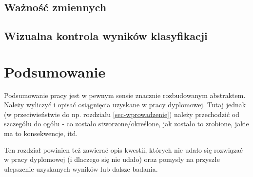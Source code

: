 \documentclass{amuthesis}
\begin{document}
\hypertarget{waux17cnoux15bux107-zmiennych}{%
\section{Ważność zmiennych}\label{waux17cnoux15bux107-zmiennych}}

\hypertarget{wizualna-kontrola-wynikuxf3w-klasyfikacji}{%
\section{Wizualna kontrola wyników
klasyfikacji}\label{wizualna-kontrola-wynikuxf3w-klasyfikacji}}


\hypertarget{podsumowanie}{%
\chapter{Podsumowanie}\label{podsumowanie}}

Podsumowanie pracy jest w pewnym sensie znacznie rozbudowanym
abstraktem. Należy wyliczyć i opisać osiągnięcia uzyskane w pracy
dyplomowej. Tutaj jednak (w przeciwieństwie do np. rozdziału
\ref{sec-wprowadzenie}) należy przechodzić od szczegółu do ogółu - co
zostało stworzone/określone, jak zostało to zrobione, jakie ma to
konsekwencje, itd.

Ten rozdział powinien też zawierać opis kwestii, których nie udało się
rozwiązać w pracy dyplomowej (i dlaczego się nie udało) oraz pomysły na
przyszłe ulepszenie uzyskanych wyników lub dalsze badania.

\printbibliography[heading=bibintoc, title=Bibliografia]
\end{document}
